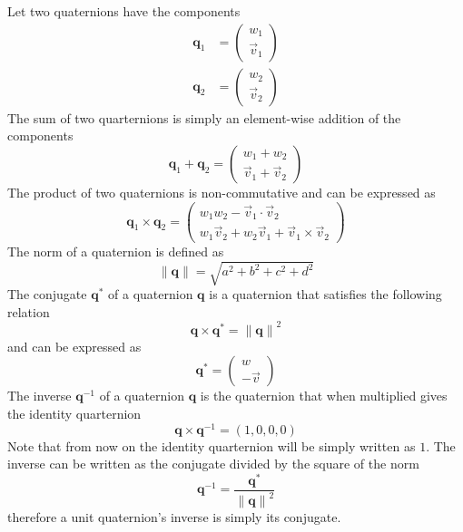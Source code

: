 Let two quaternions have the components
\begin{align}
    \mathbf{q}_1 & = \begin{pmatrix}
                         w_1 \\ \vec{v}_1
                     \end{pmatrix} \\
    \mathbf{q}_2 & = \begin{pmatrix}
                         w_2 \\ \vec{v}_2
                     \end{pmatrix}
\end{align}
The sum of two quarternions is simply an element-wise addition of the components
\begin{equation}
    \mathbf{q}_1 + \mathbf{q}_2 = \begin{pmatrix}
        w_1 + w_2 \\ \vec{v}_1 + \vec{v}_2
    \end{pmatrix}
\end{equation}
The product of two quaternions is non-commutative and can be expressed as
\begin{equation}
    \mathbf{q}_1 \times \mathbf{q}_2 = \begin{pmatrix}
        w_1 w_2 - \vec{v}_1 \cdot \vec{v}_2 \\
        w_1 \vec{v}_2 + w_2 \vec{v}_1 + \vec{v}_1 \times \vec{v}_2
    \end{pmatrix}
\end{equation}
The norm of a quaternion is defined as
\begin{equation}
    \lVert \mathbf{q} \rVert = \sqrt{a^2 + b^2 + c^2 + d^2}
\end{equation}
The conjugate \( \mathbf{q}^{*} \) of a quaternion \( \mathbf{q} \) is a quaternion that satisfies the following relation
\begin{equation*}
    \mathbf{q} \times \mathbf{q}^{*} = {\lVert \mathbf{q} \rVert}^2
\end{equation*}
and can be expressed as
\begin{equation}
    \mathbf{q}^* = \begin{pmatrix}
        w \\ -\vec{v}
    \end{pmatrix}
\end{equation}
The inverse \( \mathbf{q}^{-1} \) of a quaternion \( \mathbf{q} \) is the quaternion that when multiplied gives the identity
quarternion
\begin{equation}
    \mathbf{q} \times \mathbf{q}^{-1} = (1, 0, 0, 0)
\end{equation}
Note that from now on the identity quarternion will be simply written as \( 1 \).
The inverse can be written as the conjugate divided by the square of the norm
\begin{equation}
    \mathbf{q}^{-1} = \frac{\mathbf{q}^{*}}{{\lVert \mathbf{q} \rVert}^2}
\end{equation}
therefore a unit quaternion's inverse is simply its conjugate.

